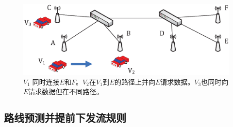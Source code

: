 \documentclass{ctexart}
\begin{document}


\begin{figure} [t]
\begin{center}
\includegraphics[width=1\columnwidth]{figures/fig-4-31.eps}

\caption{$V_{1}$ 同时连接$E$和$F$。$V_{2}$在$V_{1}$到$E$的路径上并向$E$请求数据。$V_{3}$也同时向$E$请求数据但在不同路径。} \label{fig4}
\end{center}
\end{figure}

\subsection{路线预测并提前下发流规则} \label{Predict the path}
\end{document}
